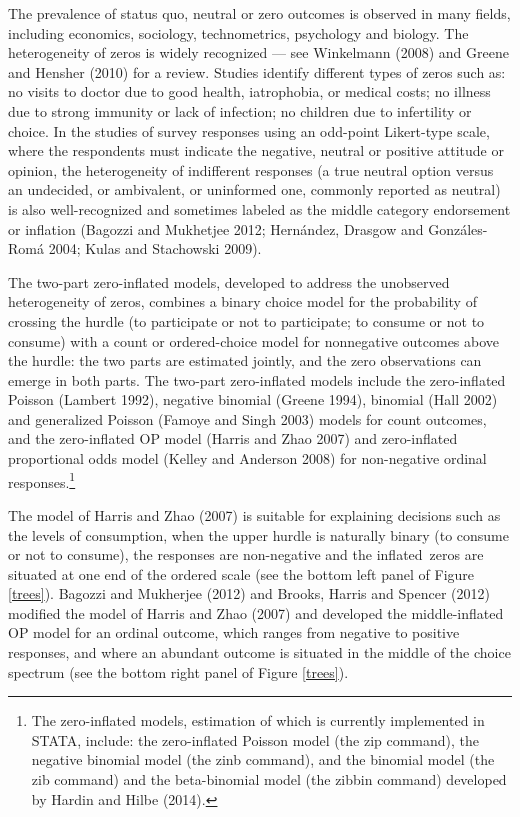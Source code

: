 \documentclass[letterpaper,fleqn,12pt]{article}
\begin{document}
The prevalence of status quo, neutral or zero outcomes is observed in many
fields, including economics, sociology, technometrics, psychology and
biology. The heterogeneity of zeros is widely recognized --- see Winkelmann
(2008) and Greene and Hensher (2010) for a review. Studies identify
different types of zeros such as: no visits to doctor due to good health,
iatrophobia, or medical costs; no illness due to strong immunity or lack of
infection; no children due to infertility or choice. In the studies of
survey responses using an odd-point Likert-type scale, where the respondents
must indicate the negative, neutral or positive attitude or opinion, the
heterogeneity of indifferent responses (a true neutral option versus an
undecided, or ambivalent, or uninformed one, commonly reported as neutral)
is also well-recognized and sometimes labeled as the middle category
endorsement or inflation (Bagozzi and Mukhetjee 2012; Hern\'{a}ndez, Drasgow
and Gonz\'{a}les-Rom\'{a} 2004; Kulas and Stachowski 2009).

The two-part zero-inflated models, developed to address the unobserved
heterogeneity of zeros, combines a binary choice model for the probability
of crossing the hurdle (to participate or not to participate; to consume or
not to consume) with a count or ordered-choice model for nonnegative
outcomes above the hurdle: the two parts are estimated jointly, and the zero
observations can emerge in both parts. The two-part zero-inflated models
include the zero-inflated Poisson (Lambert 1992), negative binomial (Greene
1994), binomial (Hall 2002) and generalized Poisson (Famoye and Singh 2003)
models for count outcomes, and the zero-inflated OP model (Harris and Zhao
2007) and zero-inflated proportional odds model (Kelley and Anderson 2008)
for non-negative ordinal responses.\footnote{%
The zero-inflated models, estimation of which is currently implemented in
STATA, include: the zero-inflated Poisson model (the zip command), the
negative binomial model (the zinb command), and the binomial model (the zib
command) and the beta-binomial model (the zibbin command) developed by
Hardin and Hilbe (2014).}

The model of Harris and Zhao (2007) is suitable for explaining decisions
such as the levels of consumption, when the upper hurdle is naturally binary
(to consume or not to consume), the responses are non-negative and the
inflated\ zeros are situated at one end of the ordered scale (see the bottom
left panel of Figure \ref{trees}). Bagozzi and Mukherjee (2012) and Brooks,
Harris and Spencer (2012) modified the model of Harris and Zhao (2007) and
developed the middle-inflated OP model for an ordinal outcome, which ranges
from negative to positive responses, and where an abundant outcome is
situated in the middle of the choice spectrum (see the bottom right panel of
Figure \ref{trees}).
\end{document}
